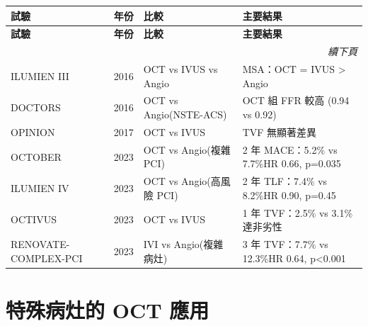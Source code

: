 \documentclass[12pt,a4paper]{article}
\begin{document}
\begin{longtable}{p{3cm}p{2.5cm}p{4cm}p{4.5cm}}
\toprule
\textbf{試驗} & \textbf{年份} & \textbf{比較} & \textbf{主要結果} \\
\midrule
\endfirsthead
\toprule
\textbf{試驗} & \textbf{年份} & \textbf{比較} & \textbf{主要結果} \\
\midrule
\endhead
\midrule
\multicolumn{4}{r}{\textit{續下頁}} \\
\endfoot
\bottomrule
\endlastfoot

ILUMIEN III & 2016 & OCT vs IVUS vs Angio & MSA：OCT = IVUS > Angio \\

DOCTORS & 2016 & OCT vs Angio\newline (NSTE-ACS) & OCT 組 FFR 較高 (0.94 vs 0.92) \\

OPINION & 2017 & OCT vs IVUS & TVF 無顯著差異 \\

OCTOBER & 2023 & OCT vs Angio\newline (複雜 PCI) & 2 年 MACE：5.2\% vs 7.7\%\newline HR 0.66, p=0.035 \\

ILUMIEN IV & 2023 & OCT vs Angio\newline (高風險 PCI) & 2 年 TLF：7.4\% vs 8.2\%\newline HR 0.90, p=0.45 \\

OCTIVUS & 2023 & OCT vs IVUS & 1 年 TVF：2.5\% vs 3.1\%\newline 達非劣性 \\

RENOVATE-\newline COMPLEX-PCI & 2023 & IVI vs Angio\newline (複雜病灶) & 3 年 TVF：7.7\% vs 12.3\%\newline HR 0.64, p<0.001 \\

\end{longtable}


\section{特殊病灶的 OCT 應用}
\end{document}
